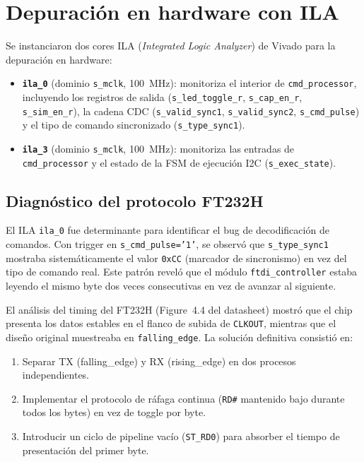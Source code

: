 \documentclass[../main.tex]{subfiles}
\begin{document}
\section{Depuración en hardware con ILA}

Se instanciaron dos cores ILA (\textit{Integrated Logic Analyzer}) de Vivado para la depuración en hardware:

\begin{itemize}
    \item \textbf{\texttt{ila\_0}} (dominio \texttt{s\_mclk}, 100~MHz): monitoriza el interior de \texttt{cmd\_processor}, incluyendo los registros de salida (\texttt{s\_led\_toggle\_r}, \texttt{s\_cap\_en\_r}, \texttt{s\_sim\_en\_r}), la cadena CDC (\texttt{s\_valid\_sync1}, \texttt{s\_valid\_sync2}, \texttt{s\_cmd\_pulse}) y el tipo de comando sincronizado (\texttt{s\_type\_sync1}).
    \item \textbf{\texttt{ila\_3}} (dominio \texttt{s\_mclk}, 100~MHz): monitoriza las entradas de \texttt{cmd\_processor} y el estado de la FSM de ejecución I2C (\texttt{s\_exec\_state}).
\end{itemize}

\subsection{Diagnóstico del protocolo FT232H}

El ILA \texttt{ila\_0} fue determinante para identificar el bug de decodificación de comandos. Con trigger en \texttt{s\_cmd\_pulse='1'}, se observó que \texttt{s\_type\_sync1} mostraba sistemáticamente el valor \texttt{0xCC} (marcador de sincronismo) en vez del tipo de comando real. Este patrón reveló que el módulo \texttt{ftdi\_controller} estaba leyendo el mismo byte dos veces consecutivas en vez de avanzar al siguiente.

El análisis del timing del FT232H (Figure~4.4 del datasheet) mostró que el chip presenta los datos estables en el flanco de subida de \texttt{CLKOUT}, mientras que el diseño original muestreaba en \texttt{falling\_edge}. La solución definitiva consistió en:

\begin{enumerate}
    \item Separar TX (falling\_edge) y RX (rising\_edge) en dos procesos independientes.
    \item Implementar el protocolo de ráfaga continua (\texttt{RD\#} mantenido bajo durante todos los bytes) en vez de toggle por byte.
    \item Introducir un ciclo de pipeline vacío (\texttt{ST\_RD0}) para absorber el tiempo de presentación del primer byte.
\end{enumerate}
\end{document}
